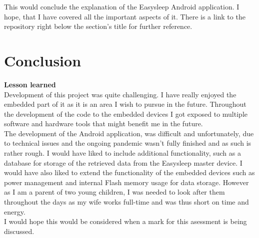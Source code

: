 \documentclass[12pt,a4paper]{article}
\begin{document}
    This would conclude the explanation of the Easysleep Android application. I hope, that I have covered all the important aspects of it. There is a link to the repository right below the section's title for further reference.
    \newpage

    \section{Conclusion}
    {\bfseries Lesson learned}\\
    
    Development of this project was quite challenging. I have really enjoyed the embedded part of it as it is an area I wish to pursue in the future. Throughout the development of the code to the embedded devices I got exposed to multiple software and hardware tools that might benefit me in the future. \\
    
    The development of the Android application, was difficult and unfortunately, due to technical issues and the ongoing pandemic wasn't fully finished and as such is rather rough. I would have liked to include additional functionality, such as a database for storage of the retrieved data from the Easysleep master device. I would have also liked to extend the functionality of the embedded devices such as power management and internal Flash memory usage for data storage. However as I am a parent of two young children, I was needed to look after them throughout the days as my wife works full-time and was thus short on time and energy. \\
    
    I would hope this would be considered when a mark for this asessment is being discussed.
    \newpage
    
\end{document}
